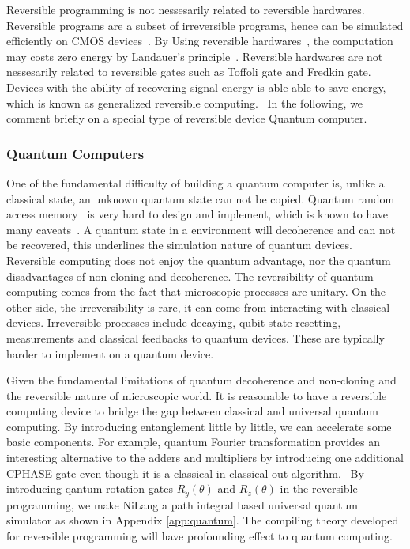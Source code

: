 \documentclass[aps,twocolumn,longbibliography,english,superscriptaddress,prr]{revtex4-1}
\newcommand{\<}{\langle}
\renewcommand{\>}{\rangle}
\newcommand{\App}[1]{Appendix \ref{#1}}
\theoremstyle{definition}\newtheorem{definition}{\textit{Definition}}
\begin{document}
Reversible programming is not nessesarily related to reversible hardwares. Reversible programs are a subset of irreversible programs, hence can be simulated efficiently on CMOS devices~\cite{Vieri1999}. By Using reversible hardwares~\cite{}, the computation may costs zero energy by Landauer's principle~\cite{Landauer1961}.
Reversible hardwares are not nessesarily related to reversible gates such as Toffoli gate and Fredkin gate.
Devices with the ability of recovering signal energy is able able to save energy, which is known as generalized reversible computing.~\cite{Frank2005,Frank2017b}
In the following, we comment briefly on a special type of reversible device Quantum computer.

\subsubsection{Quantum Computers}\label{sec:qc}
One of the fundamental difficulty of building a quantum computer is, unlike a classical state, an unknown quantum state can not be copied.
Quantum random access memory~\cite{Giovannetti2008} is very hard to design and implement, which is known to have many caveats~\cite{Aaronson2015}.
A quantum state in a environment will decoherence and can not be recovered, this underlines the simulation nature of quantum devices.
Reversible computing does not enjoy the quantum advantage, nor the quantum disadvantages of non-cloning and decoherence.
The reversibility of quantum computing comes from the fact that microscopic processes are unitary.
On the other side, the irreversibility is rare, it can come from interacting with classical devices. Irreversible processes include decaying, qubit state resetting, measurements and classical feedbacks to quantum devices. These are typically harder to implement on a quantum device.

Given the fundamental limitations of quantum decoherence and non-cloning and the reversible nature of microscopic world.
It is reasonable to have a reversible computing device to bridge the gap between classical and universal quantum computing.
By introducing entanglement little by little, we can accelerate some basic components. For example, quantum Fourier transformation provides an interesting alternative to the adders and multipliers by introducing one additional CPHASE gate even though it is a classical-in classical-out algorithm.~\cite{RuizPerez2017}
By introducing qantum rotation gates $R_y(\theta)$ and $R_z(\theta)$ in the reversible programming, we make NiLang a path integral based universal quantum simulator as shown in \App{app:quantum}. The compiling theory developed for reversible programming will have profounding effect to quantum computing.
\end{document}
